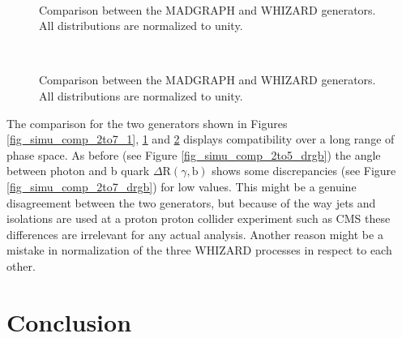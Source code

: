 \begin{figure}
  \\
  \caption{Comparison between the MADGRAPH and WHIZARD generators. All distributions are normalized to unity.}
  \label{fig_simu_comp_2to7_2}
\end{figure}
\begin{figure}
  \\
  \caption{Comparison between the MADGRAPH and WHIZARD generators. All distributions are normalized to unity.}
  \label{fig_simu_comp_2to7_3}
\end{figure}

The comparison for the two generators shown in Figures \ref{fig_simu_comp_2to7_1}, \ref{fig_simu_comp_2to7_2} and \ref{fig_simu_comp_2to7_3} displays compatibility over a long range of phase space. As before (see Figure \ref{fig_simu_comp_2to5_drgb}) the angle between photon and b quark $\Delta \mathrm{R}(\gamma,\mathrm{b})$ shows some discrepancies (see Figure \ref{fig_simu_comp_2to7_drgb}) for low values. This might be a genuine disagreement between the two generators, but because of the way jets and isolations are used at a proton proton collider experiment such as CMS these differences are irrelevant for any actual analysis.
Another reason might be a mistake in normalization of the three WHIZARD processes in respect to each other. \\

\section{Conclusion}

